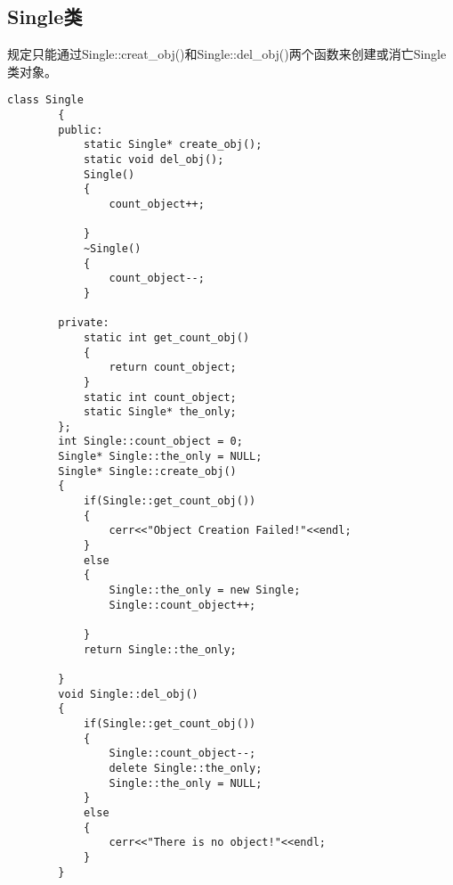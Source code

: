 \documentclass[UTF8]{ctexart}
\begin{document}
\subsection{Single类}
    规定只能通过Single::creat\_obj()和Single::del\_obj()两个函数来创建或消亡Single类对象。
    \begin{lstlisting}[language={[ANSI]C++}]
        class Single
        {
        public:
            static Single* create_obj();
            static void del_obj();
            Single()
            {
                count_object++;
                
            }
            ~Single()
            {
                count_object--;
            }
        
        private:
            static int get_count_obj()
            {
                return count_object;
            }
            static int count_object;
            static Single* the_only;
        };
        int Single::count_object = 0;
        Single* Single::the_only = NULL;
        Single* Single::create_obj()
        {
            if(Single::get_count_obj())
            {
                cerr<<"Object Creation Failed!"<<endl;
            }
            else
            {
                Single::the_only = new Single;
                Single::count_object++;
                
            }
            return Single::the_only;
            
        }
        void Single::del_obj()
        {
            if(Single::get_count_obj())
            {
                Single::count_object--;
                delete Single::the_only;
                Single::the_only = NULL;
            }
            else
            {
                cerr<<"There is no object!"<<endl;
            }
        }
    \end{lstlisting}
\end{document}
